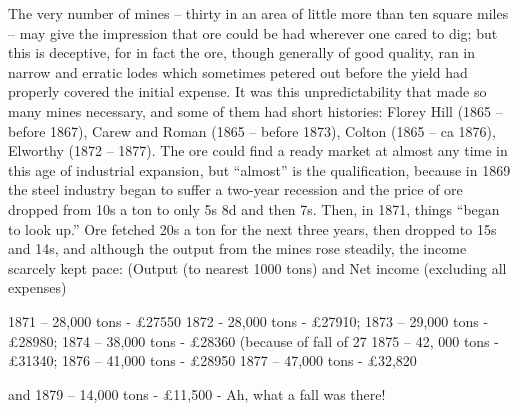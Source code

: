\documentclass[11pt]{book}
\begin{document}
  The very number of mines – thirty in an area of little more than ten square miles – may give the impression that ore could be had wherever one cared to dig; but this is deceptive, for in fact the ore, though generally of good quality, ran in narrow and erratic lodes which sometimes petered out before the yield had properly covered the initial expense. It was this unpredictability that made so many mines necessary, and some of them had short histories: Florey Hill (1865 – before 1867), Carew and Roman (1865 – before 1873), Colton (1865 – ca 1876), Elworthy (1872 – 1877).  The ore could find a ready market at almost any time in this age of industrial expansion, but “almost” is the qualification, because in 1869 the steel industry began  to suffer a two-year recession and the price of ore dropped from 10s a ton to only 5s 8d  and then 7s.  Then, in 1871, things “began to look up.” Ore fetched 20s a ton for the next three years, then dropped to 15s and 14s, and although the output from the mines rose steadily, the income scarcely kept pace: 
(Output (to nearest 1000 tons) and Net income (excluding all expenses)

        1871 – 28,000 tons -     £27550
        1872 - 28,000  tons -      £27910;
        1873 – 29,000 tons -      £28980;
        1874 – 38,000 tons -     £28360  (because of fall of 27%
        1875 – 42, 000 tons -    £31340;
        1876 – 41,000 tons -     £28950 
        1877 – 47,000 tons -     £32,820 

 and 1879 – 14,000 tons -    £11,500 -  Ah, what a fall was there! 
\end{document}

